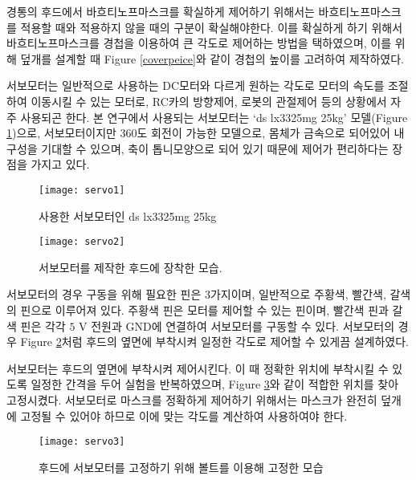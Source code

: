 경통의 후드에서 바흐티노프마스크를 확실하게 제어하기 위해서는 바흐티노프마스크를 적용할 때와 적용하지 않을 때의 구분이 확실해야한다. 이를 확실하게 하기 위해서 바흐티노프마스크를 경첩을 이용하여 큰 각도로 제어하는 방법을 택하였으며, 이를 위해 덮개를 설계할 때 \textrm{Figure} \ref{coverpeice}와 같이 경첩의 높이를 고려하여 제작하였다.

서보모터는 일반적으로 사용하는 DC모터와 다르게 원하는 각도로 모터의 속도를 조절하여 이동시킬 수 있는 모터로,  RC카의 방향제어, 로봇의 관절제어 등의 상황에서 자주 사용되곤 한다. 본 연구에서 사용되는 서보모터는 ‘ds lx3325mg 25kg’ 모델(\textrm{Figure} \ref{motor})으로, 서보모터이지만 360도 회전이 가능한 모델으로, 몸체가 금속으로 되어있어 내구성을 기대할 수 있으며, 축이 톱니모양으로 되어 있기 때문에 제어가 편리하다는 장점을 가지고 있다.

\begin{figure}[h]
	\begin{center}
		\texttt{[image: servo1]}
	\end{center}
	\caption{사용한 서보모터인 ds lx3325mg 25kg}
	\label{motor}
\end{figure}

\begin{figure}[h]
	\begin{center}
		\texttt{[image: servo2]}
	\end{center}
	\caption{서보모터를 제작한 후드에 장착한 모습.}
	\label{motorcover}
\end{figure}

서보모터의 경우 구동을 위해 필요한 핀은 3가지이며, 일반적으로 주황색, 빨간색, 갈색의 핀으로 이루어져 있다. 주황색 핀은 모터를 제어할 수 있는 핀이며, 빨간색 핀과 갈색 핀은 각각 $\textrm{5 V}$ 전원과 GND에 연결하여 서보모터를 구동할 수 있다. 서보모터의 경우 \textrm{Figure} \ref{motorcover}처럼 후드의 옆면에 부착시켜 일정한 각도로 제어할 수 있게끔 설계하였다.

서보모터는 후드의 옆면에 부착시켜 제어시킨다. 이 때 정확한 위치에 부착시킬 수 있도록 일정한 간격을 두어 실험을 반복하였으며, \textrm{Figure} \ref{servo}와 같이 적합한 위치를 찾아 고정시켰다. 서보모터로 마스크를 정확하게 제어하기 위해서는 마스크가 완전히 덮개에 고정될 수 있어야 하므로 이에 맞는 각도를 계산하여 사용하여야 한다.

\begin{figure}[ht]
	\begin{center}
		\texttt{[image: servo3]}
	\end{center}
	\caption{후드에 서보모터를 고정하기 위해 볼트를 이용해 고정한 모습}
	\label{servo}
\end{figure}



